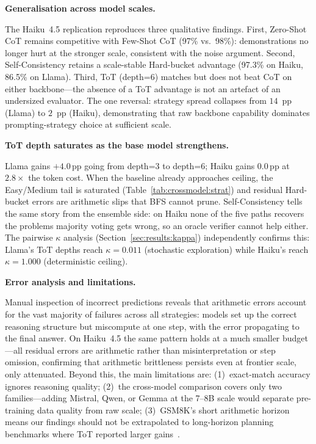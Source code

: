 ﻿\documentclass[runningheads]{llncs}
\begin{document}
\medskip\noindent\textbf{Generalisation across model scales.}

The Haiku~4.5 replication reproduces three qualitative findings.
First, Zero-Shot CoT remains competitive with Few-Shot CoT (97\% vs.\
98\%): demonstrations no longer hurt at the stronger scale, consistent
with the noise argument.
Second, Self-Consistency retains a scale-stable Hard-bucket advantage
(97.3\% on Haiku, 86.5\% on Llama).
Third, ToT (depth=6) matches but does not beat CoT on either
backbone---the absence of a ToT advantage is not an artefact of an
undersized evaluator.
The one reversal: strategy spread collapses from $14$~pp (Llama) to
$2$~pp (Haiku), demonstrating that raw backbone capability dominates
prompting-strategy choice at sufficient scale.

\medskip\noindent\textbf{ToT depth saturates as the base model strengthens.}

Llama gains $+4.0$\,pp going from depth=3 to depth=6; Haiku gains
$0.0$\,pp at $2.8\times$ the token cost.
When the baseline already approaches ceiling, the Easy/Medium tail is
saturated (Table~\ref{tab:crossmodel:strat}) and residual Hard-bucket
errors are arithmetic slips that BFS cannot prune.
Self-Consistency tells the same story from the ensemble side: on
Haiku none of the five paths recovers the problems majority voting
gets wrong, so an oracle verifier cannot help either.
The pairwise $\kappa$ analysis (Section~\ref{sec:results:kappa})
independently confirms this: Llama's ToT depths reach $\kappa=0.011$
(stochastic exploration) while Haiku's reach $\kappa=1.000$
(deterministic ceiling).

\medskip\noindent\textbf{Error analysis and limitations.}

Manual inspection of incorrect predictions reveals that arithmetic
errors account for the vast majority of failures across all strategies:
models set up the correct reasoning structure but miscompute at one
step, with the error propagating to the final answer.
On Haiku~4.5 the same pattern holds at a much smaller budget---all
residual errors are arithmetic rather than misinterpretation or step
omission, confirming that arithmetic brittleness persists even at
frontier scale, only attenuated.
Beyond this, the main limitations are: (1)~exact-match accuracy ignores
reasoning quality; (2)~the cross-model comparison covers only two
families---adding Mistral, Qwen, or Gemma at the 7--8B scale would
separate pre-training data quality from raw scale; (3)~GSM8K's short
arithmetic horizon means our findings should not be extrapolated to
long-horizon planning benchmarks where ToT reported larger
gains~\cite{yao2023tot}.
\end{document}
